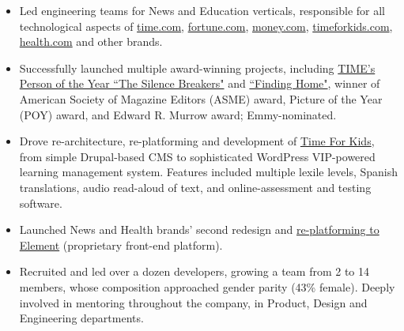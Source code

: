\documentclass[a4paper,10pt]{memoir} %
\begin{document}
\begin{itemize}
	\item Led engineering teams for News and Education verticals, responsible for all technological aspects of \href{http://time.com}{time.com}, \href{http://fortune.com}{fortune.com},  \href{http://money.com}{money.com}, \href{https://www.timeforkids.com}{timeforkids.com}, \href{https://www.health.com}{health.com} and other brands.

	\item Successfully launched multiple award-winning projects, including  \href{http://time.com/time-person-of-the-year-2017-silence-breakers/}{TIME's Person of the Year ``The Silence Breakers"} and \href{http://time.com/finding-home/}{``Finding Home"}, winner of American Society of Magazine Editors (ASME) award, Picture of the Year (POY) award, and Edward R. Murrow award; Emmy-nominated.

	\item Drove re-architecture, re-platforming and development of \href{https://www.timeforkids}{Time For Kids}, from simple Drupal-based CMS to sophisticated WordPress VIP-powered learning management system. Features included multiple lexile levels, Spanish translations, audio read-aloud of text, and online-assessment and testing software.

	\item Launched News and Health brands' second redesign and \href{https://medium.com/@acharalambides/element-the-digital-unification-of-time-inc-979656149fd3}{re-platforming to Element} (proprietary front-end platform).

	\item Recruited and led over a dozen developers, growing a team from 2 to 14 members, whose composition approached gender parity (43\% female). Deeply involved in mentoring throughout the company, in Product, Design and Engineering departments. 
\end{itemize}
\Sep %

\end{document}
